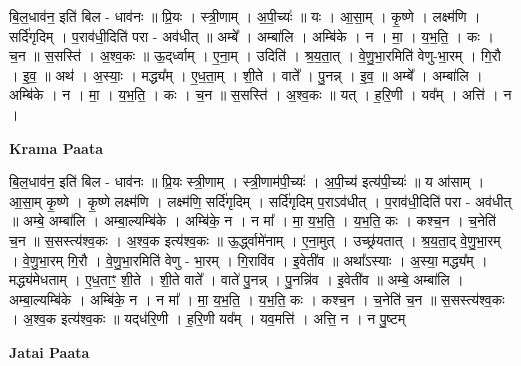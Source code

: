 \documentclass[17pt]{extarticle}
\begin{document}
बि॒ल॒धाव॑न॒ इति॑ बिल - धाव॑नः ॥ प्रि॒यः । स्त्री॒णाम् । अ॒पी॒च्यः॑ ॥ यः । आ॒सा॒म् । कृ॒ष्णे । लक्ष्म॑णि । सर्दि॑गृदिम् । प॒राव॑धी॒दिति॑ परा - अव॑धीत् ॥ अम्बे᳚ । अम्बा॑लि । अम्बि॑के । न । मा॒ । य॒भ॒ति॒ । कः । च॒न ॥ स॒सस्ति॑ । अ॒श्व॒कः ॥ ऊ॒द्‌र्ध्वाम् । ए॒ना॒म् । उदिति॑ । श्र॒य॒ता॒त् । वे॒णु॒भा॒रमिति॑ वेणु-भा॒रम् । गि॒रौ । इ॒व॒ ॥ अथ॑ । अ॒स्याः॒ । मद्ध्य᳚म् । ए॒ध॒ता॒म् । शी॒ते । वाते᳚ । पु॒नन्न् । इ॒व॒ ॥ अम्बे᳚ । अम्बा॑लि । अम्बि॑के । न । मा॒ । य॒भ॒ति॒ । कः । च॒न ॥ स॒सस्ति॑ । अ॒श्व॒कः ॥ यत् । ह॒रि॒णी । यव᳚म् । अत्ति॑ । न ।  \newline


\textbf{Krama Paata} \newline

बि॒ल॒धाव॑न॒ इति॑ बिल - धाव॑नः ॥ प्रि॒यः स्त्री॒णाम् । स्त्री॒णाम॑पी॒च्यः॑ । अ॒पी॒च्य॑ इत्य॑पी॒च्यः॑ ॥ य आ॑साम् । आ॒सा॒म् कृ॒ष्णे । कृ॒ष्णे लक्ष्म॑णि । लक्ष्म॑णि॒ सर्दि॑गृदिम् । सर्दि॑गृदिम् प॒राऽव॑धीत् । प॒राव॑धी॒दिति॑ परा - अव॑धीत् ॥ अम्बे॒ अम्बा॑लि । अम्बा॒ल्यम्बि॑के । अम्बि॑के॒ न । न मा᳚ । मा॒ य॒भ॒ति॒ । य॒भ॒ति॒ कः । कश्च॒न । च॒नेति॑ च॒न ॥ 
स॒सस्त्य॑श्व॒कः । अ॒श्व॒क इत्य॑श्व॒कः ॥ ऊ॒र्द्ध्वामे॑नाम् । ए॒ना॒मुत् । उच्छ्र॑यतात् । श्र॒य॒ता॒द् वे॒णु॒भा॒रम् । वे॒णु॒भा॒रम् गि॒रौ । वे॒णु॒भा॒रमिति॑ वेणु - भा॒रम् । गि॒रावि॑व । इ॒वेती॑व ॥ अथा᳚ऽस्याः । अ॒स्या॒ मद्ध्य᳚म् । मद्ध्य॑मेधताम् । ए॒ध॒ताꣳ॒॒ शी॒ते । शी॒ते वाते᳚ । वाते॑ पु॒नन्न् । पु॒नन्नि॑व । इ॒वेती॑व ॥ अम्बे॒ अम्बा॑लि । अम्बा॒ल्यम्बि॑के । अम्बि॑के॒ न । न मा᳚ । मा॒ य॒भ॒ति॒ । य॒भ॒ति॒ कः । कश्च॒न । च॒नेति॑ च॒न ॥ स॒सस्त्य॑श्व॒कः । अ॒श्व॒क इत्य॑श्व॒कः ॥ यद्‍ध॑रि॒णी । ह॒रि॒णी यव᳚म् । यव॒मत्ति॑ । अत्ति॒ न । न पु॒ष्टम् \newline

\textbf{Jatai Paata} \newline
\end{document}
